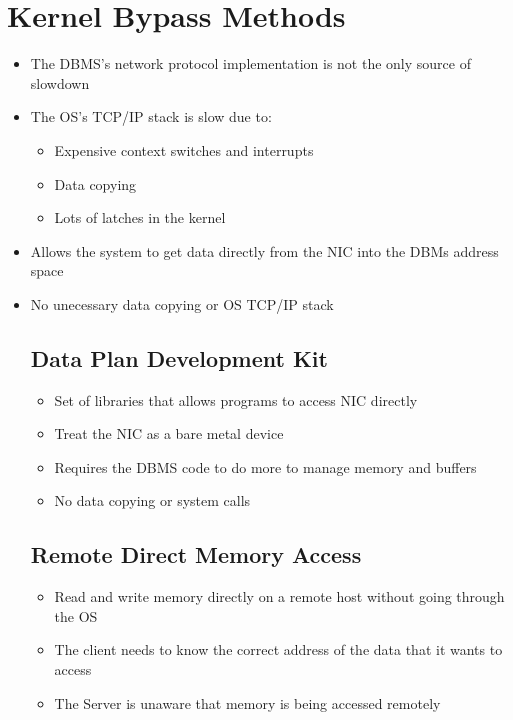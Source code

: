 \documentclass[11pt]{article}
\begin{document}
\section{Kernel Bypass Methods}
\begin{itemize}
    \item The DBMS's network protocol implementation is not the only source of slowdown
    \item The OS's TCP/IP stack is slow due to:
    \begin{itemize}
        \item Expensive context switches and interrupts
        \item Data copying
        \item Lots of latches in the kernel
    \end{itemize}
    \item Allows the system to get data directly from the NIC into the DBMs address space
    \item No unecessary data copying or OS TCP/IP stack

    \subsection*{Data Plan Development Kit}
    \begin{itemize}
        \item Set of libraries that allows programs to access NIC directly
        \item Treat the NIC as a bare metal device
        \item Requires the DBMS code to do more to manage memory and buffers
        \item No data copying or system calls
    \end{itemize}

    \subsection*{Remote Direct Memory Access}
    \begin{itemize}
        \item Read and write memory directly on a remote host without going through the OS
        \item The client needs to know the correct address of the data that it wants to access
        \item The Server is unaware that memory is being accessed remotely
    \end{itemize}



\end{itemize}







\newpage


\end{document}
